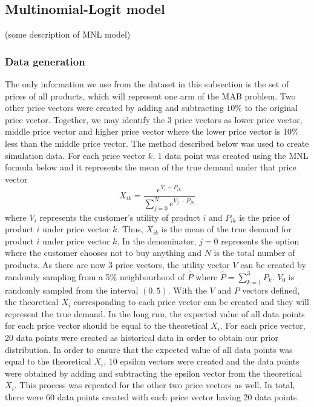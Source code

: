 \documentclass[a4paper]{article}
\begin{document}
\subsection{Multinomial-Logit model}
(some description of MNL model)

\subsubsection{Data generation}
The only information we use from the dataset in this subsection is the set of prices of all products, which will represent one arm of the MAB problem. Two other price vectors were created by adding and subtracting $10\%$ to the original price vector. Together, we may identify the 3 price vectors as lower price vector, middle price vector and higher price vector where the lower price vector is 10\% less than the middle price vector. The method described below was used to create simulation data.
\newline
\newline
For each price vector $k$, 1 data point was created using the MNL formula below and it represents the mean of the true demand under that price vector
\[X_{ik} = \frac{e^{V_i - P_{ik}}}{\sum_{j=0}^{N}e^{V_j - P_{jk}}} \tag{1}\]
where $V_i$ represents the customer's utility of product $i$ and $P_{ik}$ is the price of product $i$ under price vector $k$. Thus, $X_{ik}$ is the mean of the true demand for product $i$ under price vector $k$. In the denominator, $j=0$ represents the option where the customer chooses not to buy anything and $N$ is the total number of products.
\newline
\newline
As there are now 3 price vectors, the utility vector $V$ can be created by randomly sampling from a 5\% neighbourhood of $\hat{P}$ where $\hat{P}=\sum_{k=1}^{3}P_k$. $V_0$ is randomly sampled from the interval $(0,5).$
\newline
\newline
With the $V$ and $P$ vectors defined, the theoretical $X_i$ corresponding to each price vector can be created and they will represent the true demand. In the long run, the expected value of all data points for each price vector should be equal to the theoretical $X_i$.
\newline
\newline
For each price vector, 20 data points were created as historical data in order to obtain our prior distribution. In order to ensure that the expected value of all data points was equal to the theoretical $X_i$, 10 epsilon vectors were created and the data points were obtained by adding and subtracting the epsilon vector from the theoretical $X_i$. This process was repeated for the other two price vectors as well. In total, there were 60 data points created with each price vector having 20 data points.
\end{document}
